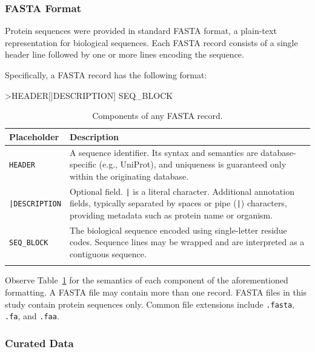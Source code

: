 \subsubsection{FASTA Format}

Protein sequences were provided in standard FASTA format, a plain-text
representation for biological sequences. Each FASTA record consists of a single
header line followed by one or more lines encoding the sequence. 

Specifically, a FASTA record has the following format:

\begin{plaintext}
>HEADER[|DESCRIPTION]
SEQ_BLOCK
\end{plaintext}

\begin{table}[htbp]
	\centering
	\caption{Components of any FASTA record.}
	\begin{tabular}{p{3cm} p{10cm}}
		\toprule
		\textbf{Placeholder} & \textbf{Description} \\
    \midrule
		\texttt{HEADER} & A sequence identifier. Its syntax and semantics are database-specific (e.g., UniProt), and uniqueness is guaranteed only within the originating database. \\
		\arrayrulecolor{gray!50}
    \midrule
		\texttt{|DESCRIPTION} & Optional field. \texttt{|} is a literal character. Additional annotation fields, typically separated by spaces or pipe (\texttt{|}) characters, providing metadata such as protein name or organism. \\
		\midrule
		\texttt{SEQ\_BLOCK} & The biological sequence encoded using single-letter residue codes. Sequence lines may be wrapped and are interpreted as a contiguous sequence. \\
		\arrayrulecolor{black}
    \bottomrule
	\end{tabular}
	\label{tab:fastaComponents}
\end{table}

Observe Table~\ref{tab:fastaComponents} for the semantics of each component of
the aforementioned formatting. A FASTA file may contain more than one record.
FASTA files in this study contain protein sequences only. Common file
extensions include \texttt{.fasta}, \texttt{.fa}, and \texttt{.faa}.

\subsubsection{Curated Data}

